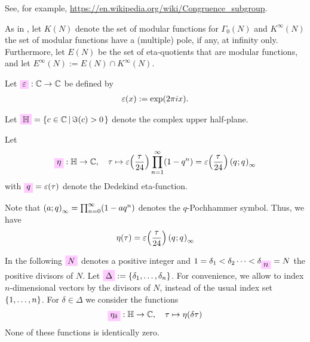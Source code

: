 \documentclass{article}
\begin{document}
See, for example,
\url{https://en.wikipedia.org/wiki/Congruence_subgroup}.

As in \cite{Radu:RamanujanKolberg:2015}, let $K(N)$ denote the set of
modular functions for $\Gamma_0(N)$ and $K^\infty(N)$ the set of
modular functions have a (multiple) pole, if any, at infinity only.
Furthermore, let $E(N)$ be the set of eta-quotients that are
modular functions, and let $E^\infty(N) := E(N)\cap K^\infty(N)$.

\begin{Definition}\label{def:epsilon}
  Let $\defineNotation[epsilon]{\unityPowerSymbol}: \setC \to \setC$
  be defined by
  \begin{gather*}
    \varepsilon\!\left(x\right) := \exp(2\pi i x).
  \end{gather*}
\end{Definition}

Let $\defineNotation[H]{\setH}=\SetDef{c\in \setC}{\Im(c)>0}$ denote
the complex upper half-plane.

Let
\begin{gather}\label{eq:eta-expansion}
  \defineNotation[eta]{\eta}: \setH \to \setC, \quad
  \tau \mapsto \unityPower{\frac{\tau}{24}} \prod_{n=1}^{\infty}(1-q^n)
  =
  \unityPower{\frac{\tau}{24}} \eulerFunction{}
\end{gather}
with $\defineNotation[q]{q} = \unityPower{\tau}$
denote the Dedekind eta-function.

Note that $\left( a;q \right)_{\infty} = \prod_{n=0}^{\infty}(1-aq^n)$ denotes
the $q$-Pochhammer symbol. Thus, we have
\begin{gather*}
  \eta(\tau) = \varepsilon\!\left(\frac{\tau}{24}\right) \left( q^{};q^{} \right)_{\infty}
\end{gather*}

In the following $\defineNotation[N]{N}$ denotes a positive integer
and $1=\delta_1<\delta_2\dots<\delta_{\defineNotation[n]{n}}=N$ the
positive divisors of $N$. Let
$\defineNotation[Delta]{\Delta}:=\Set{\delta_1,\ldots,\delta_n}$. For
convenience, we allow to index $n$-dimensional vectors by the divisors
of $N$, instead of the usual index set $\left\{1,\ldots,n\right\}$.
%
For $\delta\in\Delta$ we consider the functions
\begin{gather*}
  \defineNotation[eta-delta]{\eta_\delta}: \setH \to \setC,\quad \tau
  \mapsto \eta(\delta\tau)
\end{gather*}
None of these functions is identically zero.
\end{document}
